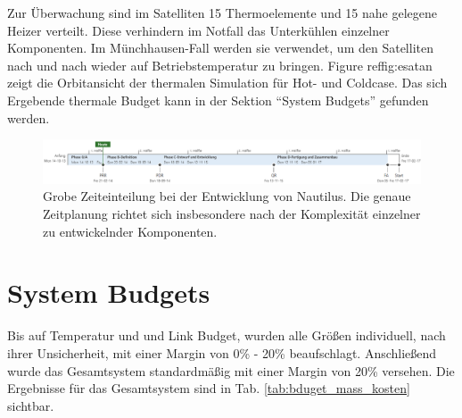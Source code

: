 \documentclass[twoside]{article}
\begin{document}
\begin{multicols}{2}
         Zur Überwachung sind im Satelliten 15 Thermoelemente und 15 nahe gelegene Heizer verteilt.
         Diese verhindern im Notfall das Unterkühlen einzelner Komponenten. Im Münchhausen-Fall werden
         sie verwendet, um den Satelliten nach und nach wieder auf Betriebstemperatur zu bringen.
         Figure ref{fig:esatan} zeigt die Orbitansicht der thermalen Simulation für Hot- und Coldcase.
         Das sich Ergebende thermale Budget kann in der Sektion ``System Budgets'' gefunden werden.
         \begin{figure}[b]
            \captionsetup{format=plain}
            \centering
            \includegraphics[width=\linewidth]{Zeitachse.png}       
            \caption{Grobe Zeiteinteilung bei der Entwicklung von Nautilus. Die genaue Zeitplanung richtet sich insbesondere nach der Komplexität einzelner zu entwickelnder Komponenten.}
            \label{fig:zeitplan}
         \end{figure}


         \section{System Budgets}
         Bis auf Temperatur und und Link Budget, wurden alle Größen individuell, nach ihrer Unsicherheit, mit einer Margin von 0\% - 20\% beaufschlagt. Anschließend wurde das Gesamtsystem standardmäßig mit einer Margin von 20\% versehen. Die Ergebnisse für das Gesamtsystem sind in Tab. \ref{tab:bduget_mass_kosten} sichtbar.\\



\end{multicols}
\end{document}
